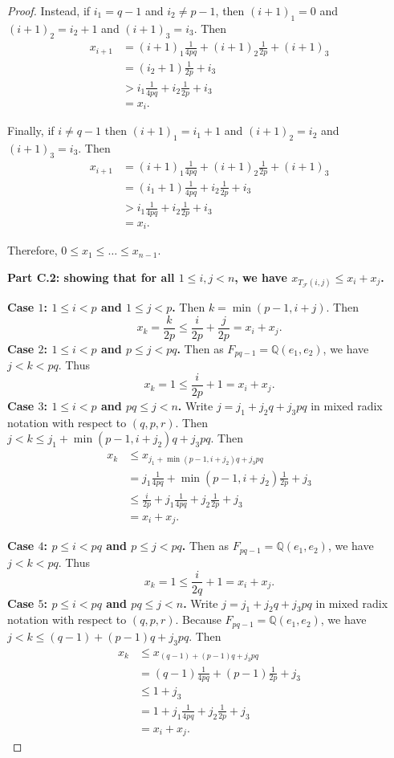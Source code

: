\documentclass[letterpaper,10pt]{amsart}
\newcommand{\QQ}{\mathbb{Q}}      %
\newcommand{\cF}{\mathcal{F}}
\theoremstyle{definition}
\theoremstyle{remark}
\begin{document}
\begin{proof}
Instead, if $i_1=q-1$ and $i_2 \neq p-1$, then $(i+1)_1 = 0$ and $(i+1)_2=i_2+1$ and $(i+1)_3 = i_3$. Then
\begin{align*}
x_{i+1} &= (i+1)_1 \frac{1}{4pq} + (i+1)_2 \frac{1}{2p} + (i+1)_3 \\
&= (i_2+1) \frac{1}{2p} + i_3 \\
&> i_1 \frac{1}{4pq} + i_2 \frac{1}{2p} + i_3 \\
&= x_{i}.
\end{align*}

Finally, if $i \neq q-1$ then $(i+1)_1 = i_1+1$ and $(i+1)_2=i_2$ and $(i+1)_3 = i_3$. Then
\begin{align*}
x_{i+1} &= (i+1)_1 \frac{1}{4pq} + (i+1)_2 \frac{1}{2p} + (i+1)_3 \\
&= (i_1+1) \frac{1}{4pq} + i_2 \frac{1}{2p} + i_3 \\
&> i_1 \frac{1}{4pq} + i_2 \frac{1}{2p} + i_3 \\
&= x_{i}.
\end{align*}

Therefore, $0 \leq x_1 \leq \dots \leq x_{n-1}$.

\noindent \textbf{Part C.2: showing that for all $1 \leq i,j < n$, we have $x_{T_{\cF}(i,j)} \leq x_i + x_j$.}

\noindent \textbf{Case $1$: $1 \leq i < p$ and $1 \leq j < p$.}
Then $k = \min(p-1, i+j)$. Then
\[
	x_k = \frac{k}{2p} \leq \frac{i}{2p} + \frac{j}{2p} = x_i + x_j.
\]
\noindent \textbf{Case $2$: $1 \leq i < p$ and $p \leq j < pq$.}
Then as $F_{pq-1} = \QQ( e_1,e_2)$, we have $j < k < pq$. Thus
\[
	x_k = 1 \leq \frac{i}{2p} + 1 = x_i + x_j.
\]
\noindent \textbf{Case $3$: $1 \leq i < p$ and $pq \leq j < n$.}
Write $j = j_1 + j_2q + j_3pq$ in mixed radix notation with respect to $(q,p,r)$. Then $j < k \leq j_1 + \min(p-1,i+j_2)q + j_3pq$. Then
\begin{align*}
x_k &\leq x_{j_1 + \min(p-1,i+j_2)q + j_3pq} \\
&= j_1 \frac{1}{4pq} + \min(p-1,i+j_2) \frac{1}{2p} + j_3 \\
&\leq \frac{i}{2p} + j_1 \frac{1}{4pq} + j_2 \frac{1}{2p} + j_3 \\
&= x_i + x_j.
\end{align*}

\noindent \textbf{Case $4$: $p \leq i < pq$ and $p \leq j < pq$.}
Then as $F_{pq-1} = \QQ( e_1,e_2)$, we have $j < k < pq$. Thus
\[
	x_k = 1 \leq \frac{i}{2q} + 1 = x_i + x_j.
\]
\noindent \textbf{Case $5$: $p \leq i < pq$ and $pq \leq j < n$.}
Write $j = j_1 + j_2q + j_3pq$ in mixed radix notation with respect to $(q,p,r)$. Because $F_{pq-1} = \QQ( e_1,e_2)$, we have $j < k \leq (q-1) + (p-1)q + j_3pq$. Then
\begin{align*}
x_k &\leq x_{(q-1) + (p-1)q + j_3pq} \\
& = (q-1) \frac{1}{4pq} + (p-1) \frac{1}{2p} + j_3 \\
& \leq 1 + j_3 \\
&= 1 + j_1 \frac{1}{4pq} + j_2 \frac{1}{2p} + j_3  \\
&= x_i + x_j.
\end{align*}


\end{proof}
\end{document}
